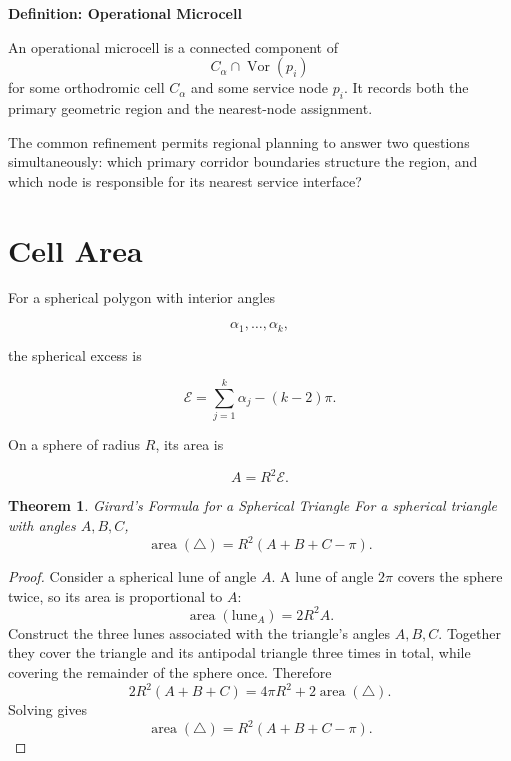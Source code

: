 \documentclass[11pt,fleqn]{book}
\numberwithin{equation}{chapter}
\newenvironment{definition}[1]
  {\begin{definitionEnv}
   \noindent\textbf{Definition: #1}\par\smallskip}
  {\end{definitionEnv}}
\theoremstyle{plain}
\newtheorem{theorem}{Theorem}[chapter]
\theoremstyle{definition}
\theoremstyle{remark}
\newcommand{\Vor}{\operatorname{Vor}}
\newcommand{\area}{\operatorname{area}}
\begin{document}
\begin{definition}{Operational Microcell}
An operational microcell is a connected component of
\[
C_\alpha\cap\Vor(p_i)
\]
for some orthodromic cell \(C_\alpha\) and some service node \(p_i\). It records both the primary geometric region and the nearest-node assignment.
\end{definition}

The common refinement permits regional planning to answer two questions simultaneously: which primary corridor boundaries structure the region, and which node is responsible for its nearest service interface?

\section{Cell Area}

For a spherical polygon with interior angles

\begin{equation}
    \alpha_1,\dots,\alpha_k,
\end{equation}

the spherical excess is

\begin{equation}
    \mathcal{E}
    =
    \sum_{j=1}^{k}\alpha_j
    -
    (k-2)\pi.
\end{equation}

On a sphere of radius \(R\), its area is

\begin{equation}
    A
    =
    R^2\mathcal{E}.
\end{equation}

\begin{theorem}{Girard's Formula for a Spherical Triangle}
For a spherical triangle with angles \(A,B,C\),
\[
\area(\triangle)
=
R^2(A+B+C-\pi).
\]
\end{theorem}

\begin{proof}
Consider a spherical lune of angle \(A\). A lune of angle \(2\pi\) covers the sphere twice, so its area is proportional to \(A\):
\[
\area(\text{lune}_A)
=
2R^2A.
\]
Construct the three lunes associated with the triangle's angles \(A,B,C\). Together they cover the triangle and its antipodal triangle three times in total, while covering the remainder of the sphere once. Therefore
\[
2R^2(A+B+C)
=
4\pi R^2
+
2\area(\triangle).
\]
Solving gives
\[
\area(\triangle)
=
R^2(A+B+C-\pi).
\]
\end{proof}
\end{document}
